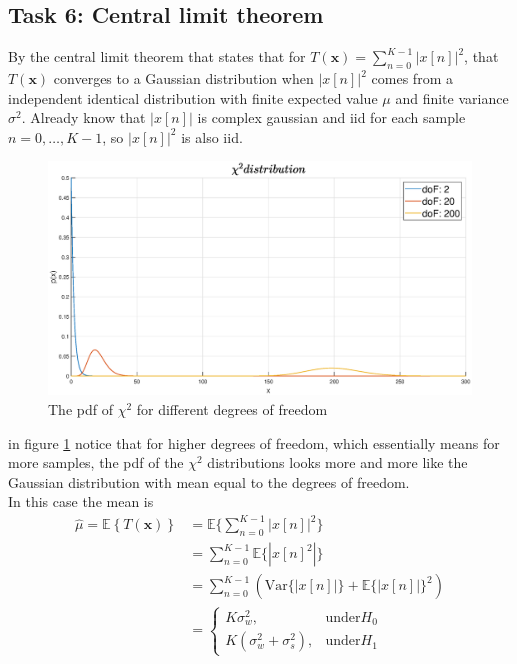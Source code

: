\subsection{Task 6: Central limit theorem}
By the central limit theorem that states that for $T(\mathbf{x}) = \sum_{n=0}^{K-1}|x[n]|^2$, that $T(\mathbf{x})$ converges to a Gaussian distribution when $|x[n]|^2$ comes from a independent identical distribution with finite expected value $\mu$ and finite variance $\sigma^2$. Already know that $|x[n]|$ is complex gaussian and iid for each sample $n = 0, \dots, K-1$, so $|x[n]|^2$ is also iid.\\
\begin{figure}
    \centering
    \includegraphics[width=\textwidth]{figures/chi_square.eps}
    \caption{The pdf of $\chi^2$ for different degrees of freedom}
    \label{fig:chitogauss}
\end{figure}
in figure \ref{fig:chitogauss} notice that for higher degrees of freedom, which essentially means for more samples, the pdf of the $\chi^2$ distributions looks more and more like the Gaussian distribution with mean equal to the degrees of freedom.\\
In this case the mean is
\begin{align}
    \hat{\mu} = \mathbb{E}\left\{T(\mathbf{x})\right\} & = \mathbb{E}\{\sum_{n=0}^{K-1}|x[n]|^2\}\nonumber\\
    & = \sum_{n=0}^{K-1}\mathbb{E}\{|x[n]^2|\}\nonumber\\
    & = \sum_{n=0}^{K-1}(\text{Var}\{|x[n]|\}+\mathbb{E}\{|x[n]|\}^2)\nonumber\\
    & = \begin{cases}
    K\sigma_w^2, & \text{under} H_0\\
    K(\sigma_w^2+\sigma_s^2), & \text{under} H_1
    \end{cases}
\end{align}
